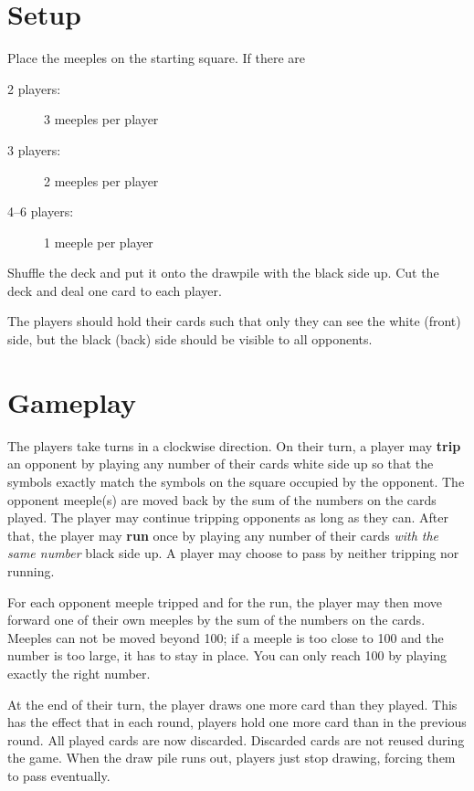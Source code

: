 \documentclass{article}
\begin{document}
\section*{Setup}

Place the meeples on the starting square. If there are

\begin{description}

\item[2 players:] 3 meeples per player

\item[3 players:] 2 meeples per player

\item[4--6 players:] 1 meeple per player

\end{description}

Shuffle the deck and put it onto the drawpile with the black side up. Cut the deck and deal one card to each player.

The players should hold their cards such that only they can see the white (front) side, but the black (back) side should be visible to all opponents. 

\section*{Gameplay}

The players take turns in a clockwise direction. On their turn, a player may \textbf{trip} an opponent by playing any number of their cards white side up so that the symbols exactly match the symbols on the square occupied by the opponent. The opponent meeple(s) are moved back by the sum of the numbers on the cards played. The player may continue tripping opponents as long as they can. After that, the player may \textbf{run} once by playing any number of their cards \textit{with the same number} black side up. A player may choose to pass by neither tripping nor running.

For each opponent meeple tripped and for the run, the player may then move forward one of their own meeples by the sum of the numbers on the cards. Meeples can not be moved beyond 100; if a meeple is too close to 100 and the number is too large, it has to stay in place. You can only reach 100 by playing exactly the right number.

At the end of their turn, the player draws one more card than they played. This has the effect that in each round, players hold one more card than in the previous round. All played cards are now discarded. Discarded cards are not reused during the game. When the draw pile runs out, players just stop drawing, forcing them to pass eventually.
\end{document}
